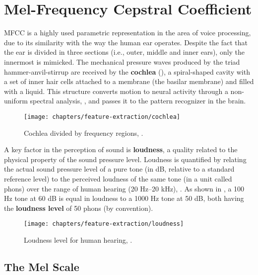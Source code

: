 \section{Mel-Frequency Cepstral Coefficient}

MFCC is a highly used parametric representation in the area of voice processing, due to its similarity with the way the human ear operates. Despite the fact that the ear is divided in three sections (i.e., outer, middle and inner ears), only the innermost is mimicked. The mechanical pressure waves produced by the triad hammer-anvil-stirrup are received by the \textbf{cochlea} (), a spiral-shaped cavity with a set of inner hair cells attached to a membrane (the basilar membrane) and filled with a liquid. This structure converts motion to neural activity through a non-uniform spectral analysis, , and passes it to the pattern recognizer in the brain.

\begin{figure}[ht]
    \centering
    \texttt{[image: chapters/feature-extraction/cochlea]}
    \caption{Cochlea divided by frequency regions, .}
    \label{fig:cochlea}
\end{figure}

A key factor in the perception of sound is \textbf{loudness}, a quality related to the physical property of the sound pressure level. Loudness is quantified by relating the actual sound pressure level of a pure tone (in dB, relative to a standard reference level) to the perceived loudness of the same tone (in a unit called phons) over the range of human hearing (20 Hz–20 kHz), . As shown in , a 100 Hz tone at 60 dB is equal in loudness to a 1000 Hz tone at 50 dB, both having the \textbf{loudness level} of 50 phons (by convention).

\begin{figure}[ht]
    \centering
    \texttt{[image: chapters/feature-extraction/loudness]}
    \caption{Loudness level for human hearing, .}
    \label{fig:loudness}
\end{figure}

\subsection{The Mel Scale}

